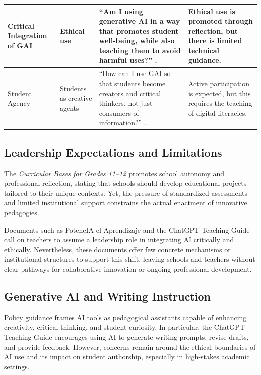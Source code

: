 \documentclass[english]{textolivre}
\begin{document}
\begin{table}[htbp]
\begin{threeparttable}
\begin{tabularx}{\textwidth}{
>{\raggedright\arraybackslash}p{}
>{\raggedright\arraybackslash}p{}
X
>{\raggedright\arraybackslash}p{}}
Critical Integration of GAI &
Ethical use &
``Am I using generative AI in a way that promotes student well-being, while also teaching them to avoid harmful uses?'' \cite[p.~6, own translation]{mineducchile2025potencia}. &
Ethical use is promoted through reflection, but there is limited technical guidance. \\
\midrule

Student Agency &
Students as creative agents &
``How can I use GAI so that students become creators and critical thinkers, not just consumers of information?'' \cite[p.~6, own translation]{mineducchile2025potencia}. &
Active participation is expected, but this requires the teaching of digital literacies. \\

\bottomrule
\end{tabularx}
\end{threeparttable}
\end{table}


\subsection{Leadership Expectations and Limitations}\label{sec-modelo}
The \textit{Curricular Bases for Grades 11–12} \cite{mineduc2019bases} promotes school autonomy and professional reflection, stating that schools should develop educational projects tailored to their unique contexts. Yet, the pressure of standardized assessments and limited institutional support constrains the actual enactment of innovative pedagogies.

Documents such as PotencIA el Aprendizaje \cite{mineducchile2025potencia} and the ChatGPT Teaching Guide \cite{mineduc2023chatgpt} call on teachers to assume a leadership role in integrating AI critically and ethically. Nevertheless, these documents offer few concrete mechanisms or institutional structures to support this shift, leaving schools and teachers without clear pathways for collaborative innovation or ongoing professional development.


\subsection{Generative AI and Writing Instruction}
Policy guidance frames AI tools as pedagogical assistants capable of enhancing creativity, critical thinking, and student curiosity. In particular, the ChatGPT Teaching Guide encourages using AI to generate writing prompts, revise drafts, and provide feedback. However, concerns remain around the ethical boundaries of AI use and its impact on student authorship, especially in high-stakes academic settings.
\end{document}
